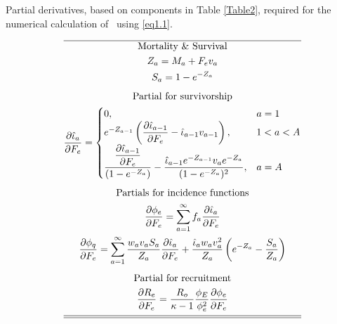 \begin{table}
  \centering
\caption{Partial derivatives, based on components in Table
\ref{Table2}, required for the numerical calculation of \fmsy\ using \eqref{eq1.1}.}\label{Table3} \tableEq
    \begin{gather}
        \hline
        \mbox{Mortality \& Survival} \nonumber \\
        Z_{a}=M_a+F_ev_a \label{T3.1} \\
        S_{a}=1-e^{-Z_a}\label{T3.2}\\[1ex]
        \mbox{Partial for survivorship} \nonumber \\
        \frac{\partial \hat{\iota}_a}{\partial F_e} =
        \begin{cases}
          0,& a=1 \label{T3.3}\\
          e^{-Z_{a-1}}\left(\dfrac{\partial \hat{\iota}_{a-1}}{\partial F_e}
           -\hat{\iota}_{a-1}v_{a-1}\right),& 1<a<A\\
           \dfrac{\dfrac{\partial \hat{\iota}_{a-1}}{\partial F_e}}
           {(1-e^{-Z_a})} -
           \dfrac{\hat{\iota}_{a-1} e^{-Z_{a-1}} v_a e^{-Z_a}}
           {(1-e^{-Z_a})^2}, &a=A
        \end{cases} \\[1ex]
        \mbox{Partials for incidence functions} \nonumber \\
        \frac{\partial \phi_e}{\partial F_e}=
            \sum_{a=1}^\infty f_a \frac{\partial \hat{\iota}_a}{\partial F_e} \label{T3.4}\\
        \frac{\partial \phi_q}{\partial F_e}=
            \sum_{a=1}^\infty \frac{w_av_a S_a}{Z_a}
             \frac{\partial \hat{\iota}_a}{\partial F_e}
             +\frac{\hat{\iota}_a w_av_a^2}{Z_a}\left(e^{-Z_a}-\frac{S_a}{Z_a} \right) \label{T3.5}\\[1ex]
        \mbox{Partial for recruitment} \nonumber\\
        \frac{\partial R_e}{\partial F_e}=\frac{R_o}{\kappa-1}
        \frac{\phi_E}{\phi_e^2} \frac{\partial \phi_e}{\partial
        F_e} \label{T3.6}\\[1ex]
        \hline \hline \nonumber
    \end{gather}

    \normalEq
\end{table}
	
